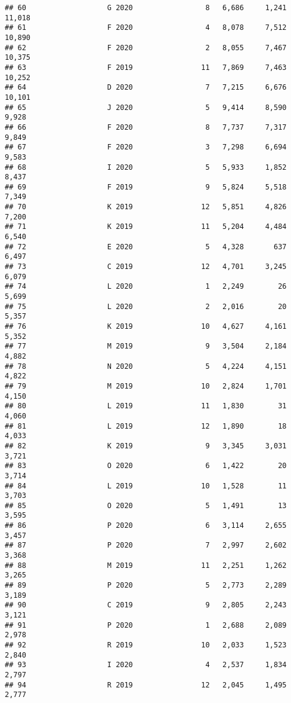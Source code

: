 \documentclass[
]{article}
\begin{document}
\begin{verbatim}
## 60                   G 2020                 8   6,686     1,241   11,018
## 61                   F 2020                 4   8,078     7,512   10,890
## 62                   F 2020                 2   8,055     7,467   10,375
## 63                   F 2019                11   7,869     7,463   10,252
## 64                   D 2020                 7   7,215     6,676   10,101
## 65                   J 2020                 5   9,414     8,590    9,928
## 66                   F 2020                 8   7,737     7,317    9,849
## 67                   F 2020                 3   7,298     6,694    9,583
## 68                   I 2020                 5   5,933     1,852    8,437
## 69                   F 2019                 9   5,824     5,518    7,349
## 70                   K 2019                12   5,851     4,826    7,200
## 71                   K 2019                11   5,204     4,484    6,540
## 72                   E 2020                 5   4,328       637    6,497
## 73                   C 2019                12   4,701     3,245    6,079
## 74                   L 2020                 1   2,249        26    5,699
## 75                   L 2020                 2   2,016        20    5,357
## 76                   K 2019                10   4,627     4,161    5,352
## 77                   M 2019                 9   3,504     2,184    4,882
## 78                   N 2020                 5   4,224     4,151    4,822
## 79                   M 2019                10   2,824     1,701    4,150
## 80                   L 2019                11   1,830        31    4,060
## 81                   L 2019                12   1,890        18    4,033
## 82                   K 2019                 9   3,345     3,031    3,721
## 83                   O 2020                 6   1,422        20    3,714
## 84                   L 2019                10   1,528        11    3,703
## 85                   O 2020                 5   1,491        13    3,595
## 86                   P 2020                 6   3,114     2,655    3,457
## 87                   P 2020                 7   2,997     2,602    3,368
## 88                   M 2019                11   2,251     1,262    3,265
## 89                   P 2020                 5   2,773     2,289    3,189
## 90                   C 2019                 9   2,805     2,243    3,121
## 91                   P 2020                 1   2,688     2,089    2,978
## 92                   R 2019                10   2,033     1,523    2,840
## 93                   I 2020                 4   2,537     1,834    2,797
## 94                   R 2019                12   2,045     1,495    2,777

\end{verbatim}
\end{document}
